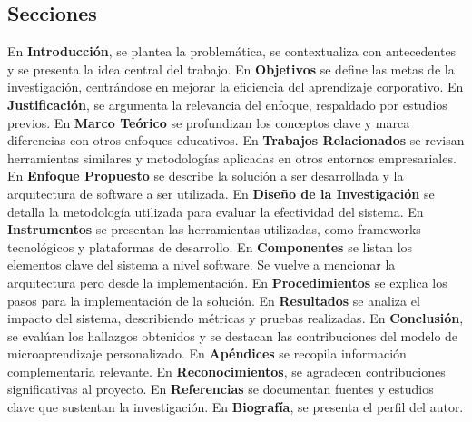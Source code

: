 \subsection{Secciones}

En \textbf{Introducción}, se plantea la problemática, se contextualiza con antecedentes y se presenta la idea central del trabajo.
En \textbf{Objetivos} se define las metas de la investigación, centrándose en mejorar la eficiencia del aprendizaje corporativo.
En \textbf{Justificación}, se argumenta la relevancia del enfoque, respaldado por estudios previos.
En \textbf{Marco Teórico} se profundizan los conceptos clave y marca diferencias con otros enfoques educativos.
En \textbf{Trabajos Relacionados} se revisan herramientas similares y metodologías aplicadas en otros entornos empresariales.
En \textbf{Enfoque Propuesto} se describe la solución a ser desarrollada y la arquitectura de software a ser utilizada.
En \textbf{Diseño de la Investigación} se detalla la metodología utilizada para evaluar la efectividad del sistema.
En \textbf{Instrumentos} se presentan las herramientas utilizadas, como frameworks tecnológicos y plataformas de desarrollo.
En \textbf{Componentes} se listan los elementos clave del sistema a nivel software. Se vuelve a mencionar la arquitectura pero desde la implementación.
En \textbf{Procedimientos} se explica los pasos para la implementación de la solución.
En \textbf{Resultados} se analiza el impacto del sistema, describiendo métricas y pruebas realizadas.
En \textbf{Conclusión}, se evalúan los hallazgos obtenidos y se destacan las contribuciones del modelo de microaprendizaje personalizado.
En \textbf{Apéndices} se recopila información complementaria relevante.
En \textbf{Reconocimientos}, se agradecen contribuciones significativas al proyecto.
En \textbf{Referencias} se documentan fuentes y estudios clave que sustentan la investigación.
En \textbf{Biografía}, se presenta el perfil del autor.
